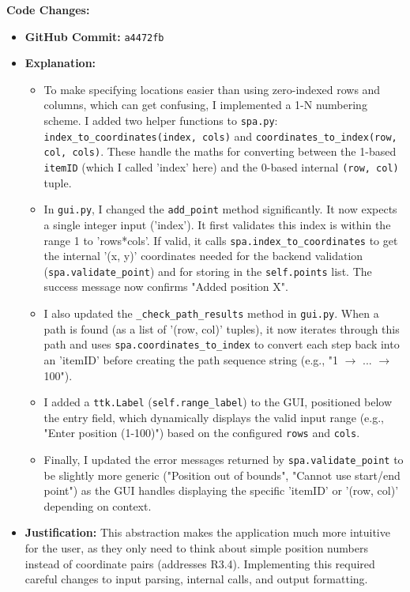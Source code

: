 \textbf{Code Changes:}
\begin{itemize}
	\item \textbf{GitHub Commit:} \verb|a4472fb|
	\item \textbf{Explanation:}
	\begin{itemize}
		\item To make specifying locations easier than using zero-indexed rows and columns, which can get confusing, I implemented a 1-N numbering scheme. I added two helper functions to \verb|spa.py|: \verb|index_to_coordinates(index, cols)| and \verb|coordinates_to_index(row, col, cols)|. These handle the maths for converting between the 1-based \verb|itemID| (which I called 'index' here) and the 0-based internal \verb|(row, col)| tuple.
		\item In \verb|gui.py|, I changed the \verb|add_point| method significantly. It now expects a single integer input ('index'). It first validates this index is within the range 1 to 'rows*cols'. If valid, it calls \verb|spa.index_to_coordinates| to get the internal '(x, y)' coordinates needed for the backend validation (\verb|spa.validate_point|) and for storing in the \verb|self.points| list. The success message now confirms "Added position X".
		\item I also updated the \verb|_check_path_results| method in \verb|gui.py|. When a path is found (as a list of '(row, col)' tuples), it now iterates through this path and uses \verb|spa.coordinates_to_index| to convert each step back into an 'itemID' before creating the path sequence string (e.g., "1 $ \rightarrow $ ... $ \rightarrow $ 100").
		\item I added a \verb|ttk.Label| (\verb|self.range_label|) to the GUI, positioned below the entry field, which dynamically displays the valid input range (e.g., "Enter position (1-100)") based on the configured \verb|rows| and \verb|cols|.
		\item Finally, I updated the error messages returned by \verb|spa.validate_point| to be slightly more generic ("Position out of bounds", "Cannot use start/end point") as the GUI handles displaying the specific 'itemID' or '(row, col)' depending on context.
	\end{itemize}
	\item \textbf{Justification:} This abstraction makes the application much more intuitive for the user, as they only need to think about simple position numbers instead of coordinate pairs (addresses R3.4). Implementing this required careful changes to input parsing, internal calls, and output formatting.
\end{itemize}

